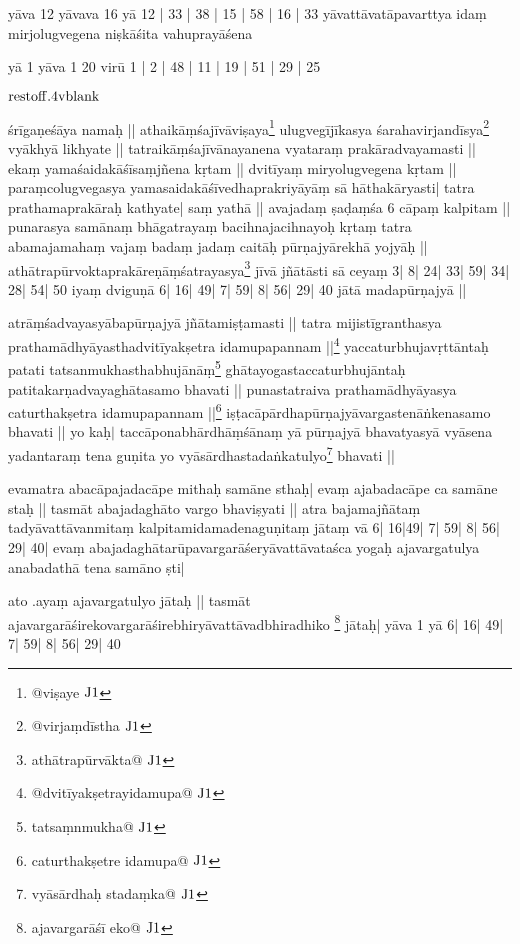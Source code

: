 \documentclass[10pt]{article}
\begin{document}
 yāva 12
 yāvava 16 yā 12 | 33 | 38 | 15 | 58 | 16 | 33 yāvattāvatāpavarttya idaṃ mirjolugvegena niṣkāśita vahuprayāśena 
 
 yā 1 yāva 1 20 virū 1 | 2 | 48 | 11 | 19 | 51 | 29 | 25
 
  ${\rm rest of f.4v blank}$
 
 
 
  śrīgaṇeśāya namaḥ || 
athaikāṃśajīvāviṣaya\footnote{@viṣaye ${\rm J1}$}
ulugvegījīkasya 
śarahavirjandīsya\footnote{@virjaṃdīstha ${\rm J1}$}
vyākhyā likhyate ||
tatraikāṃśajīvānayanena vyataraṃ prakāradvayamasti ||
ekaṃ yamaśaidakāśīsaṃjñena kṛtam ||
dvitīyaṃ miryolugvegena kṛtam ||
paraṃcolugvegasya yamasaidakāśīvedhaprakriyāyāṃ 
sā hāthakāryasti|
tatra prathamaprakāraḥ kathyate| saṃ yathā ||
avajadaṃ ṣaḍaṃśa 6 cāpaṃ kalpitam ||
punarasya samānaṃ bhāgatrayaṃ bacihnajacihnayoḥ kṛtaṃ
tatra abamajamahaṃ vajaṃ badaṃ jadaṃ caitāḥ pūrṇajyārekhā 
yojyāḥ || 
athātrapūrvoktaprakāreṇāṃśatrayasya\footnote{athātrapūrvākta@
${\rm J1}$}
jīvā jñātāsti sā ceyaṃ 3| 8| 24| 33| 59| 34| 28| 54| 50 
iyaṃ dviguṇā 6| 16| 49| 7| 59| 8| 56| 29| 40 jātā madapūrṇajyā ||

atrāṃśadvayasyābapūrṇajyā jñātamiṣṭamasti ||
tatra mijistīgranthasya 
prathamādhyāyasthadvitīyakṣetra 
 idamupapannam ||\footnote{@dvitīyakṣetrayidamupa@ ${\rm J1}$}
yaccaturbhujavṛttāntaḥ patati 
tatsanmukhasthabhujānāṃ\footnote{tatsaṃnmukha@ ${\rm J1}$}
ghātayogastaccaturbhujāntaḥ patitakarṇadvayaghātasamo bhavati ||
punastatraiva prathamādhyāyasya 
caturthakṣetra idamupapannam ||\footnote{caturthakṣetre idamupa@ ${\rm J1}$}
iṣṭacāpārdhapūrṇajyāvargastenāṅkenasamo bhavati ||
yo kaḥ\(|\) taccāponabhārdhāṃśānaṃ yā pūrṇajyā bhavatyasyā
vyāsena yadantaraṃ tena guṇita yo 
vyāsārdhastadaṅkatulyo\footnote{vyāsārdhaḥ stadaṃka@ ${\rm J1}$}
 bhavati ||

evamatra abacāpajadacāpe mithaḥ samāne sthaḥ|
evaṃ ajabadacāpe ca samāne staḥ ||
tasmāt abajadaghāto vargo bhaviṣyati ||
atra bajamajñātaṃ tadyāvattāvanmitaṃ kalpitamidamadenaguṇitaṃ
jātaṃ vā 6| 16|49| 7| 59| 8| 56| 29| 40|
evaṃ abajadaghātarūpavargarāśeryāvattāvataśca yogaḥ
ajavargatulya anabadathā tena samāno ṣti|

ato .ayaṃ ajavargatulyo jātaḥ || 
tasmāt 
ajavargarāśirekovargarāśirebhiryāvattāvadbhiradhiko
\footnote{ajavargarāśī eko@ ${\rm J1}$}
jātaḥ|
yāva 1 yā 6| 16| 49| 7| 59| 8| 56| 29| 40 
\end{document}
